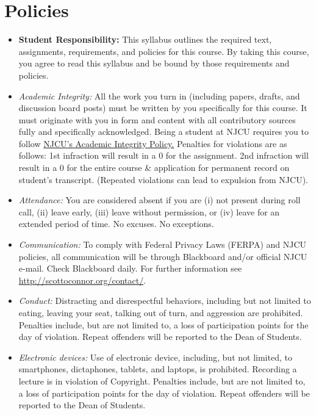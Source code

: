 \documentclass[article,oneside]{memoir}
\begin{document}
\section{Policies}

\begin{itemize}

\item \textbf{Student Responsibility:} This syllabus outlines the required text, assignments, requirements, and policies for this course. By taking this course, you agree to read this syllabus and be bound by those requirements and policies. 

 \item \textit{Academic Integrity:} All the work you turn in (including papers, drafts, and discussion board posts) must be written by you specifically for this course. It must originate with you in form and content with all contributory sources fully and specifically acknowledged. Being a student at NJCU requires you to follow \href{http://scottoconnor.org/resources/Plagiarism.pdf}{NJCU's Academic Integrity Policy.} Penalties for violations are as follows: 1st infraction will result in a 0 for the assignment.  2nd infraction will result in a 0 for the entire course \& application for permanent record on student's transcript. (Repeated violations can lead to expulsion from NJCU). 

\item \textit{Attendance:} You are considered absent if you are (i) not present during roll call, (ii) leave early, (iii) leave without permission, or (iv) leave for an extended period of time. No excuses. No exceptions.



\item \textit{Communication:} To comply with Federal Privacy Laws (FERPA) and NJCU policies, all communication will be through Blackboard and/or official NJCU e-mail. Check Blackboard daily. For further information see \href{http://scottoconnor.org/contact/}{http://scottoconnor.org/contact/}.

\item \textit{Conduct:} Distracting and disrespectful behaviors, including but not limited to eating, leaving your seat, talking out of turn, and aggression are prohibited. Penalties include, but are not limited to, a loss of participation points for the day of violation. Repeat offenders will be reported to the Dean of Students. 

\item \textit{Electronic devices:} Use of electronic device, including, but not limited, to smartphones, dictaphones, tablets, and laptops, is prohibited. Recording a lecture is in violation of Copyright. Penalties include, but are not limited to, a loss of participation points for the day of violation. Repeat offenders will be reported to the Dean of Students.


\end{itemize}
\end{document}

